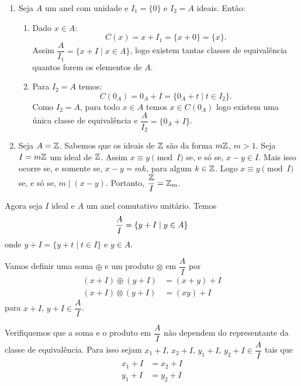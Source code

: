 \begin{exemplos}
    \begin{enumerate}[label={\arabic*})]
        \item Seja $A$ um anel com unidade e $I_{1} = \{0\}$ e $I_{2} = A$ ideais. Então:
        \begin{enumerate}[label={\roman*})]
        \item Dado $x \in A$:
        \[
            C(x) = x + I_{1} = \{x + 0\} = \{x\}.
        \]
        Assim $\dfrac{A}{I_{1}} = \{x + I \mid x \in A\}$, logo existem tantas classes de equival{\^e}ncia quantos forem os elementos de $A$.

        \item Para $I_{2} = A$ temos:
        \[
            C(0_A) = 0_A + I = \{0_A + t \mid t \in I_{2}\}.
        \]
        Como $I_2 = A$, para todo $x \in A$ temos $x \in C(0_A)$ logo existem uma única classe de equival\^encia
        e $\dfrac{A}{I_{2}} = \{0_{A} + I\}$.
    \end{enumerate}

    \item Seja $A = \mathbb{Z}$. Sabemos que os ideais de $\mathbb{Z}$ são da forma $m\mathbb{Z}$, $m > 1$. Seja $I = m\mathbb{Z}$ um ideal de $\mathbb{Z}$. Assim $x\equiv y \pmod I$ se, e s\'o se, $x - y \in I$.
        Mais isso ocorre se, e somente se, $x - y = mk $, para algum $k \in \mathbb{Z}$. Logo $x\equiv y \pmod I$ se, e s\'o se, $m\mid (x - y)$. Portanto, $\dfrac{\mathbb{Z}}{I} = \mathbb{Z}_m$.
    \end{enumerate}
\end{exemplos}


Agora seja $I$ ideal e $A$ um anel comutativo unitário. Temos
\[
    \dfrac{A}{I} = \{y + I \mid y \in A\}\\
\]
onde $y + I = \{y + t \mid t \in I\}$ e $y \in A$.

Vamos definir uma soma $\oplus$ e um produto $\otimes$ em $\dfrac{A}{I}$ por
\begin{align*}
    (x + I)\oplus(y + I) &= (x + y) + I\\
    (x + I)\otimes(y + I) &= (xy) + I
\end{align*}
para $x + I$, $y + I \in \dfrac{A}{I}$.

Verifiquemos que a soma e o produto em $\dfrac{A}{I}$ não dependem do representante da classe de equival{\^e}ncia.
Para isso sejam $x_1 + I$, $x_2 + I$, $y_1 + I$, $y_2 + I \in \dfrac{A}{I}$ tais que
\begin{align*}
    x_1 + I &= x_2 + I\\
    y_1 + I &= y_2 + I
\end{align*}

